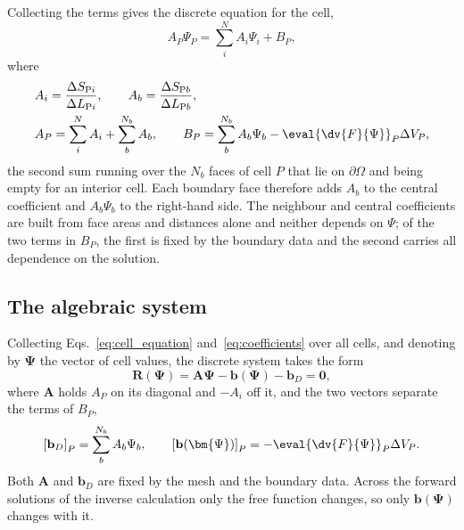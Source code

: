 Collecting the terms gives the discrete equation for the cell,
\begin{equation}
  A_P \Psi_P = \sum_{i}^{N} A_i \Psi_i + B_P ,
  \label{eq:cell_equation}
\end{equation}
where
\begin{equation}  \label{eq:coefficients}
\begin{aligned}   
  &A_i = \frac{\Delta S_{\mathrm{P}i}}{\Delta L_{\mathrm{P}i}} ,
  \qquad
  A_b = \frac{\Delta S_{\mathrm{P}b}}{\Delta L_{\mathrm{P}b}} ,
  \\
  &A_P = \sum_{i}^{N} A_i + \sum_{b}^{N_b} A_b ,
  \qquad
  B_P = \sum_{b}^{N_b} A_b \Psi_b - \eval{\dv{F}{\Psi}}_P \Delta V_P ,
\end{aligned}
\end{equation}
the second sum running over the $N_b$ faces of cell $P$ that lie on $\partial\Omega$ and being empty for an interior cell. Each boundary face therefore adds $A_b$ to the central coefficient and $A_b\Psi_b$ to the right-hand side. The neighbour and central coefficients are built from face areas and distances alone and neither depends on $\Psi$; of the two terms in $B_P$, the first is fixed by the boundary data and the second carries all dependence on the solution.

\subsection{The algebraic system}
\label{subsec:algebraic_system}

Collecting Eqs.~\eqref{eq:cell_equation} and~\eqref{eq:coefficients} over all cells, and denoting by $\bm{\Psi}$ the vector of cell values, the discrete system takes the form
\begin{equation}
  \mathbf{R}(\bm{\Psi})
  =
  \mathbf{A}\bm{\Psi}
  -
  \mathbf{b}(\bm{\Psi})
  -
  \mathbf{b}_D
  =
  \mathbf{0} ,
  \label{eq:residual}
\end{equation}
where $\mathbf{A}$ holds $A_P$ on its diagonal and $-A_i$ off it, and the two vectors separate the terms of $B_P$,
\begin{equation}
  \left[ \mathbf{b}_D \right]_P = \sum_{b}^{N_b} A_b \Psi_b ,
  \qquad
  \left[ \mathbf{b}(\bm{\Psi}) \right]_P = - \eval{\dv{F}{\Psi}}_P \Delta V_P .
  \label{eq:rhs_split}
\end{equation}
Both $\mathbf{A}$ and $\mathbf{b}_D$ are fixed by the mesh and the boundary data. Across the forward solutions of the inverse calculation only the free function changes, so only $\mathbf{b}(\bm{\Psi})$ changes with it.

